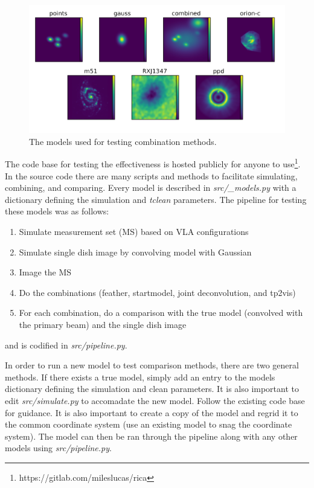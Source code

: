 \documentclass[manuscript,linenumbers]{aastex62}
\begin{document}
\begin{figure}[t]
    \includegraphics[width=\textwidth]{figures/models}
    \caption{The models used for testing combination methods.}
    \label{fig:models}
\end{figure}

The code base for testing the effectiveness is hosted publicly for anyone to use\footnote{https://gitlab.com/mileslucas/rica}. In the source code there are many scripts and methods to facilitate simulating, combining, and comparing. Every model is described in \textit{src/\_models.py} with a dictionary defining the simulation and \textit{tclean} parameters. The pipeline for testing these models was as follows:
\begin{enumerate}
    \item Simulate measurement set (MS) based on VLA configurations
    \item Simulate single dish image by convolving model with Gaussian
    \item Image the MS 
    \item Do the combinations (feather, startmodel, joint deconvolution, and tp2vis)
    \item For each combination, do a comparison with the true model (convolved with the primary beam) and the single dish image
\end{enumerate}
and is codified in \textit{src/pipeline.py}. 

In order to run a new model to test comparison methods, there are two general methods. If there exists a true model, simply add an entry to the models dictionary defining the simulation and clean parameters. It is also important to edit \textit{src/simulate.py} to accomadate the new model. Follow the existing code base for guidance. It is also important to create a copy of the model and regrid it to the common coordinate system (use an existing model to snag the coordinate system). The model can then be ran through the pipeline along with any other models using \textit{src/pipeline.py}.
\end{document}
